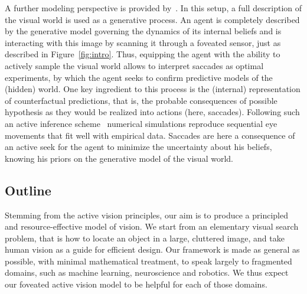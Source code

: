 A further modeling perspective is {\color{red} provided by~\cite{Friston12}}. In this setup, a full description of the visual world is used as a generative process. An agent is completely described by the generative model governing the dynamics of its internal beliefs and is interacting with this image by scanning it through a foveated sensor, just as described in Figure~\ref{fig:intro}. Thus, equipping the agent with the ability to actively sample the visual world %
allows to interpret saccades as optimal experiments, by which the agent seeks to confirm predictive models of the (hidden) world. One key ingredient to this process is the (internal) representation of counterfactual predictions, that is, the probable consequences of possible hypothesis as they would be realized into actions (here, saccades). Following such an active inference scheme~\cite{Mirza18} numerical simulations reproduce sequential eye movements that fit well with empirical data. %
Saccades %
are here a consequence of an active seek for the agent to minimize the uncertainty about his beliefs, knowing his priors on the generative model of the visual world.

\subsection*{Outline}


Stemming from the active vision principles, our aim is to produce a principled and resource-effective model of vision.
We start from an elementary visual search problem, that is how to locate an object in a large, cluttered image, and take human vision as a guide for efficient design. Our framework is made as general as possible, with minimal mathematical treatment, to speak largely to fragmented domains, such as machine learning, neuroscience and robotics. We thus expect our foveated active vision model to be helpful for each of those domains.

